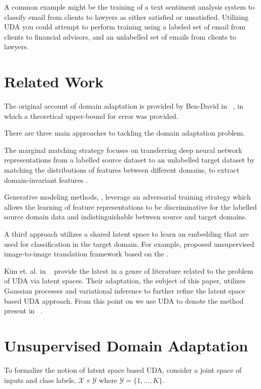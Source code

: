 \documentclass[10pt,twocolumn,letterpaper]{article}
\begin{document}
A common example might be the training of a text sentiment analysis system to classify email from clients to lawyers as either satisfied or unsatisfied. 
Utilizing UDA you could attempt to perform training using a labeled set of email from clients to financial advisors, and an unlabelled set of emails from clients to lawyers.

\section{Related Work}

The original account of domain adaptation is provided by Ben-David in ~\cite{ben2010theory}, in which a theoretical upper-bound for error was provided. 

There are three main approaches to tackling the domain adaptation problem.

The marginal matching strategy focuses on transferring deep neural network representations from a labelled source dataset to an unlabelled target dataset by matching the distributions of features between different domains, to extract domain-invariant features \cite{sun2016deep}. 

Generative modeling methods, \cite{rebuffi2017learning} \cite{courty2017joint} \cite{benaim2017one}, leverage an adversarial training strategy which allows the learning of feature representations to be discriminative for the labelled source domain data and indistinguishable between source and target domains.

A third approach utilizes a shared latent space to learn an embedding that are used for classification in the target domain.  For example, \cite{liu2017unsupervised} proposed unsupervised image-to-image translation framework based on the \cite{liu2016coupled}.  

Kim et. al. in ~\cite{kim2019unsupervised} provide the latest in a genre of literature related to the problem of UDA via latent spaces.  Their adaptation, the subject of this paper, utilizes Gaussian processes and variational inference to further refine the latent space based UDA approach.  From this point on we use UDA to denote the method present in ~\cite{kim2019unsupervised}.     

\section{Unsupervised Domain Adaptation}
To formalize the notion of latent space based UDA, consider a joint space of inputs and class labels, \(\mathcal{X} \times \mathcal{Y}\) where \(\mathcal{Y} = \{1,\dots,K\}\). 
\end{document}
